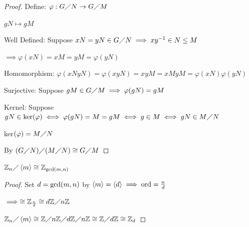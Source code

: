 \begin{proof}
    Define: $\varphi: G \diagup N \rightarrow G \diagup M$

    \hspace{1.2in}$gN \mapsto gM$

    Well Defined: Suppose $xN=yN \in G \diagup N \implies xy^{-1}\in N \leq M$ 
    
    $\implies \varphi(xN)=xM=yM=\varphi(yN)$

    Homomorphism: $\varphi(xNyN)=\varphi(xyN)=xyM=xMyM=\varphi(xN)\varphi(yN)$

    Surjective: Suppose $gM \in G \diagup M \implies \varphi(gN)=gM$

    Kernel: Suppose $gN \in \text{ker}(\varphi) \iff \varphi(gN)=M=gM \iff g \in M \iff gN \in M\diagup N$

    ker$(\varphi)=M\diagup N$

    By  
    $(G \diagup N)\diagup (M \diagup N) \cong G \diagup M$
\end{proof}

\newpage
\begin{corollary}
    $\mathbb{Z}_n\diagup \left\langle m \right\rangle \cong \mathbb{Z}_{\text{gcd}(m,n)}$
\end{corollary}

\begin{proof}
    Set $d=\text{gcd}(m,n)$  by  $\left\langle m \right\rangle=\left\langle d \right\rangle \implies \text{ord} = \frac{n}{d}$

    $\implies \cong \mathbb{Z}_{\frac{n}{d}} \cong d\mathbb{Z}\diagup n\mathbb{Z}$

    $\mathbb{Z}_n\diagup \left\langle m \right\rangle \cong \mathbb{Z}\diagup n\mathbb{Z} \diagup d\mathbb{Z} \diagup n\mathbb{Z} \cong \mathbb{Z}\diagup d\mathbb{Z} \cong \mathbb{Z}_d$
\end{proof}


